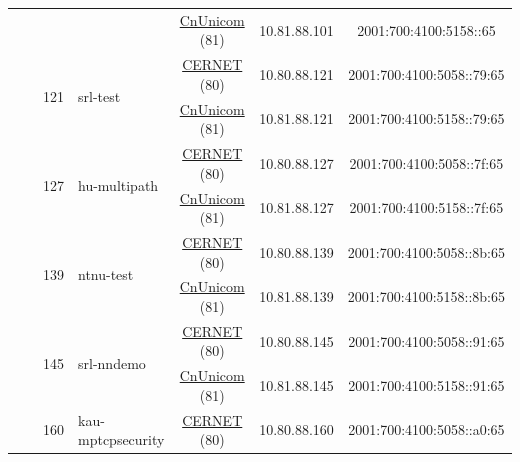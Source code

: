 \begin{small}
\begin{center}
\begin{longtable}{|c|c|c|c|c|c|c|c|}
  &  & \multicolumn{2}{|c|}{} & \multicolumn{2}{|c|}{\tiny{\href{http://www.chinaunicom.com}{CnUnicom} (81)}} & \tiny{10.81.88.101} & \tiny{2001:700:4100:5158::65} \\* \cline{3-3}\cline{4-4}\cline{5-5}\cline{6-6}\cline{7-7}\cline{8-8}
  &  & \multirow{2}{*}{\tiny{121}} & \multicolumn{1}{|l|}{\multirow{2}{*}{\tiny{srl-test}}} & \multicolumn{2}{|c|}{\tiny{\href{http://www.cernet.edu.cn}{CERNET} (80)}} & \tiny{10.80.88.121} & \tiny{2001:700:4100:5058::79:65} \\* \cline{5-5}\cline{6-6}\cline{7-7}\cline{8-8}
  &  &  &  & \multicolumn{2}{|c|}{\tiny{\href{http://www.chinaunicom.com}{CnUnicom} (81)}} & \tiny{10.81.88.121} & \tiny{2001:700:4100:5158::79:65} \\* \cline{3-3}\cline{4-4}\cline{5-5}\cline{6-6}\cline{7-7}\cline{8-8}
  &  & \multirow{2}{*}{\tiny{127}} & \multicolumn{1}{|l|}{\multirow{2}{*}{\tiny{hu-multipath}}} & \multicolumn{2}{|c|}{\tiny{\href{http://www.cernet.edu.cn}{CERNET} (80)}} & \tiny{10.80.88.127} & \tiny{2001:700:4100:5058::7f:65} \\* \cline{5-5}\cline{6-6}\cline{7-7}\cline{8-8}
  &  &  &  & \multicolumn{2}{|c|}{\tiny{\href{http://www.chinaunicom.com}{CnUnicom} (81)}} & \tiny{10.81.88.127} & \tiny{2001:700:4100:5158::7f:65} \\* \cline{3-3}\cline{4-4}\cline{5-5}\cline{6-6}\cline{7-7}\cline{8-8}
  &  & \multirow{2}{*}{\tiny{139}} & \multicolumn{1}{|l|}{\multirow{2}{*}{\tiny{ntnu-test}}} & \multicolumn{2}{|c|}{\tiny{\href{http://www.cernet.edu.cn}{CERNET} (80)}} & \tiny{10.80.88.139} & \tiny{2001:700:4100:5058::8b:65} \\* \cline{5-5}\cline{6-6}\cline{7-7}\cline{8-8}
  &  &  &  & \multicolumn{2}{|c|}{\tiny{\href{http://www.chinaunicom.com}{CnUnicom} (81)}} & \tiny{10.81.88.139} & \tiny{2001:700:4100:5158::8b:65} \\* \cline{3-3}\cline{4-4}\cline{5-5}\cline{6-6}\cline{7-7}\cline{8-8}
  &  & \multirow{2}{*}{\tiny{145}} & \multicolumn{1}{|l|}{\multirow{2}{*}{\tiny{srl-nndemo}}} & \multicolumn{2}{|c|}{\tiny{\href{http://www.cernet.edu.cn}{CERNET} (80)}} & \tiny{10.80.88.145} & \tiny{2001:700:4100:5058::91:65} \\* \cline{5-5}\cline{6-6}\cline{7-7}\cline{8-8}
  &  &  &  & \multicolumn{2}{|c|}{\tiny{\href{http://www.chinaunicom.com}{CnUnicom} (81)}} & \tiny{10.81.88.145} & \tiny{2001:700:4100:5158::91:65} \\* \cline{3-3}\cline{4-4}\cline{5-5}\cline{6-6}\cline{7-7}\cline{8-8}
  &  & \multirow{2}{*}{\tiny{160}} & \multicolumn{1}{|l|}{\multirow{2}{*}{\tiny{kau-mptcpsecurity}}} & \multicolumn{2}{|c|}{\tiny{\href{http://www.cernet.edu.cn}{CERNET} (80)}} & \tiny{10.80.88.160} & \tiny{2001:700:4100:5058::a0:65} \\* \cline{5-5}\cline{6-6}\cline{7-7}\cline{8-8}

\end{longtable}
\end{center}
\end{small}
